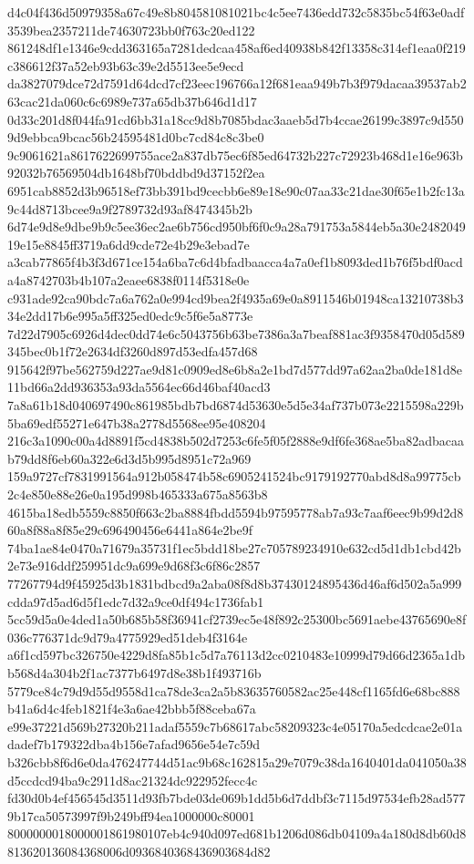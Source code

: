 \documentclass[11pt,a4paper]{article}
\begin{document}
{d4c04f436d50979358a67c49e8b804581081021bc4c5ee7436edd732c5835bc54f63e0adf3539bea2357211de74630723bb0f763c20ed122
861248df1e1346e9cdd363165a7281dedcaa458af6ed40938b842f13358c314ef1eaa0f219c386612f37a52eb93b63c39e2d5513ee5e9ecd
da3827079dce72d7591d64dcd7cf23eec196766a12f681eaa949b7b3f979dacaa39537ab263cac21da060c6c6989e737a65db37b646d1d17
0d33c201d8f044fa91cd6bb31a18cc9d8b7085bdac3aaeb5d7b4ccae26199c3897c9d5509d9ebbca9bcac56b24595481d0bc7cd84c8c3be0
9c9061621a8617622699755ace2a837db75ec6f85ed64732b227c72923b468d1e16e963b92032b76569504db1648bf70bddbd9d37152f2ea
6951cab8852d3b96518ef73bb391bd9cecbb6e89e18e90c07aa33c21dae30f65e1b2fc13a9c44d8713bcee9a9f2789732d93af8474345b2b
6d74e9d8e9dbe9b9c5ee36ec2ae6b756cd950bf6f0c9a28a791753a5844eb5a30e248204919e15e8845ff3719a6dd9cde72e4b29e3ebad7e
a3cab77865f4b3f3d671ce154a6ba7c6d4bfadbaacca4a7a0ef1b8093ded1b76f5bdf0acda4a8742703b4b107a2eaee6838f0114f5318e0e
c931ade92ca90bdc7a6a762a0e994cd9bea2f4935a69e0a8911546b01948ca13210738b334e2dd17b6e995a5ff325ed0edc9c5f6e5a8773e
7d22d7905c6926d4dec0dd74e6c5043756b63be7386a3a7beaf881ac3f9358470d05d589345bec0b1f72e2634df3260d897d53edfa457d68
915642f97be562759d227ae9d81c0909ed8e6b8a2e1bd7d577dd97a62aa2ba0de181d8e11bd66a2dd936353a93da5564ec66d46baf40acd3
7a8a61b18d040697490c861985bdb7bd6874d53630e5d5e34af737b073e2215598a229b5ba69edf55271e647b38a2778d5568ee95e408204
216c3a1090c00a4d8891f5cd4838b502d7253c6fe5f05f2888e9df6fe368ae5ba82adbacaab79dd8f6eb60a322e6d3d5b995d8951c72a969
159a9727cf7831991564a912b058474b58c6905241524bc9179192770abd8d8a99775cb2c4e850e88e26e0a195d998b465333a675a8563b8
4615ba18edb5559c8850f663c2ba8884fbdd5594b97595778ab7a93c7aaf6eec9b99d2d860a8f88a8f85e29c696490456e6441a864e2be9f
74ba1ae84e0470a71679a35731f1ec5bdd18be27c705789234910e632cd5d1db1cbd42b2e73e916ddf259951dc9a699e9d68f3c6f86c2857
77267794d9f45925d3b1831bdbcd9a2aba08f8d8b37430124895436d46af6d502a5a999cdda97d5ad6d5f1edc7d32a9ce0df494c1736fab1
5cc59d5a0e4ded1a50b685b58f36941cf2739ec5e48f892c25300bc5691aebe43765690e8f036c776371dc9d79a4775929ed51deb4f3164e
a6f1cd597bc326750e4229d8fa85b1c5d7a76113d2cc0210483e10999d79d66d2365a1dbb568d4a304b2f1ac7377b6497d8e38b1f493716b
5779ce84c79d9d55d9558d1ca78de3ca2a5b83635760582ac25e448cf1165fd6e68bc888b41a6d4c4feb1821f4e3a6ae42bbb5f88ceba67a
e99e37221d569b27320b211adaf5559c7b68617abc58209323c4e05170a5edcdcae2e01adadef7b179322dba4b156e7afad9656e54e7c59d
b326cbb8f6d6e0da476247744d51ac9b68c162815a29e7079c38da1640401da041050a38d5ccdcd94ba9c2911d8ac21324dc922952fecc4c
fd30d0b4ef456545d3511d93fb7bde03de069b1dd5b6d7ddbf3c7115d97534efb28ad5779b17ca50573997f9b249bff94ea1000000c80001
8000000018000001861980107eb4c940d097ed681b1206d086db04109a4a180d8db60d8813620136084368006d0936840368436903684d82
}
\end{document}
